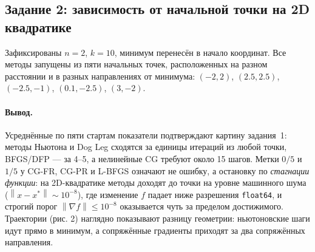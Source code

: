 \documentclass[a4paper,12pt]{article}
\newcommand{\norm}[1]{\left\|#1\right\|}
\newcommand{\grad}{\nabla}
\theoremstyle{definition}
\begin{document}
\subsection{Задание 2: зависимость от начальной точки на 2D квадратике}

Зафиксированы $n = 2$, $k = 10$, минимум перенесён в начало координат. Все методы запущены из
пяти начальных точек, расположенных на разном расстоянии и в разных направлениях от минимума:
$(-2, 2)$, $(2.5, 2.5)$, $(-2.5, -1)$, $(0.1, -2.5)$, $(3, -2)$.



\paragraph{Вывод.}
Усреднённые по пяти стартам показатели подтверждают картину задания~1: методы Ньютона и Dog Leg
сходятся за единицы итераций из любой точки, BFGS/DFP — за 4--5, а нелинейные CG требуют около
15 шагов. Метки $0/5$ и $1/5$ у CG-FR, CG-PR и L-BFGS означают не ошибку, а остановку по
\emph{стагнации функции}: на 2D-квадратике методы доходят до точки на уровне машинного шума
($\norm{x - x^*} \sim 10^{-8}$), где изменение $f$ падает ниже разрешения \texttt{float64}, и
строгий порог $\norm{\grad f} \leq 10^{-8}$ оказывается чуть за пределом достижимого. Траектории
(рис. 2) наглядно показывают разницу геометрии: ньютоновские шаги идут прямо в
минимум, а сопряжённые градиенты приходят за два сопряжённых направления.
\end{document}
